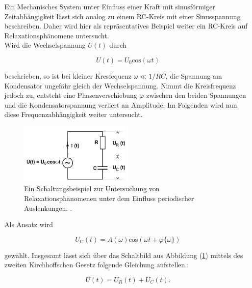         \noindent Ein Mechanisches System unter Einfluss einer Kraft mit sinusförmiger Zeitabhängigkeit lässt sich analog zu einem RC-Kreis mit 
        einer Sinusspannung beschreiben. Daher wird hier als repräsentatives Beispiel weiter ein RC-Kreis auf Relaxationsphänomene untersucht.\\
        Wird die Wechselspannung $U(t)$ durch

        \begin{equation*}
            U(t) = U_0 \text{cos}( \omega t)
        \end{equation*}

        \noindent beschrieben, so ist bei kleiner Kresfequenz $\omega \ll 1/RC$, die Spannung am Kondensator ungefähr gleich der Wechselspannung.
        Nimmt die Kreisfrequenz jedoch zu, entsteht eine Phasenverschiebung $\varphi$ zwischen den beiden Spannungen und die 
        Kondensatorspannung verliert an Amplitude. Im Folgenden wird nun diese Frequenzabhängigkeit weiter untersucht.

        \begin{figure}
            \centering
            \includegraphics[width=0.5\textwidth]{latex/images/periodische_Auslenkung.PNG}
            \caption{Ein Schaltungsbeispiel zur Untersuchung von Relaxationsphänomenen unter dem Einfluss periodischer Auslenkungen.
            \protect \cite{V353}.}
            \label{img:per_Aus}
        \end{figure}

        \noindent Als Ansatz wird

        \begin{equation}
            U_{\text{C}}(t) = A(\omega) \text{cos}(\omega t + \varphi \{ \omega \} )
            \label{eqn:7}
        \end{equation}

        \noindent gewählt. Insgesamt lässt sich über das Schaltbild aus Abbildung (\ref{img:per_Aus}) mittels des zweiten Kirchhoffschen Gesetz
        folgende Gleichung aufstellen.:

        \begin{equation}
            U(t) = U_R(t) + U_C(t) .
            \label{eqn:7a}
        \end{equation}

